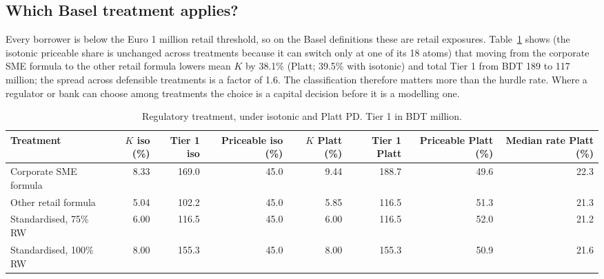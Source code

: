 \documentclass[11pt,a4paper]{article}
\newcommand{\tabsize}{\footnotesize}
\begin{document}
\subsection{Which Basel treatment applies?}
Every borrower is below the Euro 1 million retail threshold, so on the Basel definitions these are retail exposures. Table~\ref{tab:treat} shows (the isotonic priceable share is unchanged across treatments because it can switch only at one of its 18 atoms) that moving from the corporate SME formula to the other retail formula lowers mean $K$ by 38.1\% (Platt; 39.5\% with isotonic) and total Tier 1 from BDT 189 to 117 million; the spread across defensible treatments is a factor of 1.6. The classification therefore matters more than the hurdle rate. Where a regulator or bank can choose among treatments the choice is a capital decision before it is a modelling one.
\begin{table}[H]\centering\tabsize\setlength{\tabcolsep}{3pt}\caption{Regulatory treatment, under isotonic and Platt PD. Tier 1 in BDT million.}\label{tab:treat}
\begin{adjustbox}{max width=\textwidth}
\begin{tabular}{lrrrrrrr}
\toprule
Treatment & $K$ iso (\%) & Tier 1 iso & Priceable iso (\%) & $K$ Platt (\%) & Tier 1 Platt & Priceable Platt (\%) & Median rate Platt (\%) \\
\midrule
Corporate SME formula & 8.33 & 169.0 & 45.0 & 9.44 & 188.7 & 49.6 & 22.3 \\
Other retail formula & 5.04 & 102.2 & 45.0 & 5.85 & 116.5 & 51.3 & 21.3 \\
Standardised, 75\% RW & 6.00 & 116.5 & 45.0 & 6.00 & 116.5 & 52.0 & 21.2 \\
Standardised, 100\% RW & 8.00 & 155.3 & 45.0 & 8.00 & 155.3 & 50.9 & 21.6 \\
\bottomrule
\end{tabular}
\end{adjustbox}\end{table}
\end{document}
